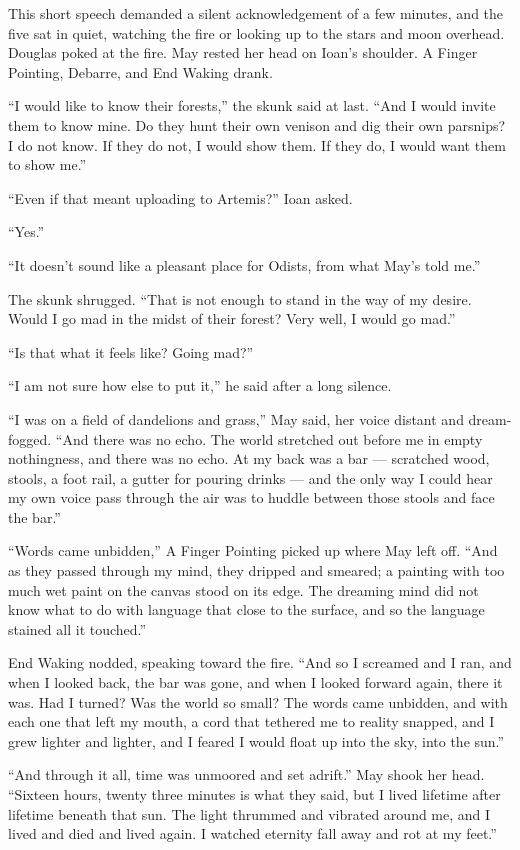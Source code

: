 This short speech demanded a silent acknowledgement of a few minutes, and the five sat in quiet, watching the fire or looking up to the stars and moon overhead. Douglas poked at the fire. May rested her head on Ioan's shoulder. A Finger Pointing, Debarre, and End Waking drank.

``I would like to know their forests,'' the skunk said at last. ``And I would invite them to know mine. Do they hunt their own venison and dig their own parsnips? I do not know. If they do not, I would show them. If they do, I would want them to show me.''

``Even if that meant uploading to Artemis?'' Ioan asked.

``Yes.''

``It doesn't sound like a pleasant place for Odists, from what May's told me.''

The skunk shrugged. ``That is not enough to stand in the way of my desire. Would I go mad in the midst of their forest? Very well, I would go mad.''

``Is that what it feels like? Going mad?''

``I am not sure how else to put it,'' he said after a long silence.

``I was on a field of dandelions and grass,'' May said, her voice distant and dream-fogged. ``And there was no echo. The world stretched out before me in empty nothingness, and there was no echo. At my back was a bar — scratched wood, stools, a foot rail, a gutter for pouring drinks — and the only way I could hear my own voice pass through the air was to huddle between those stools and face the bar.''

``Words came unbidden,'' A Finger Pointing picked up where May left off. ``And as they passed through my mind, they dripped and smeared; a painting with too much wet paint on the canvas stood on its edge. The dreaming mind did not know what to do with language that close to the surface, and so the language stained all it touched.''

End Waking nodded, speaking toward the fire. ``And so I screamed and I ran, and when I looked back, the bar was gone, and when I looked forward again, there it was. Had I turned? Was the world so small? The words came unbidden, and with each one that left my mouth, a cord that tethered me to reality snapped, and I grew lighter and lighter, and I feared I would float up into the sky, into the sun.''

``And through it all, time was unmoored and set adrift.'' May shook her head. ``Sixteen hours, twenty three minutes is what they said, but I lived lifetime after lifetime beneath that sun. The light thrummed and vibrated around me, and I lived and died and lived again. I watched eternity fall away and rot at my feet.''

